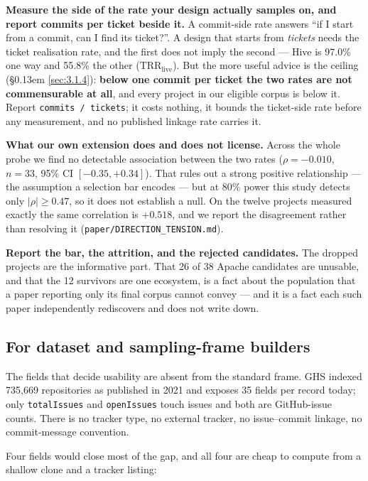 \documentclass[sigconf,review,anonymous]{acmart}
\begin{document}
\textbf{Measure the side of the rate your design actually samples on, and report commits per ticket beside it.} A commit-side rate answers ``if I start from a commit, can I find its ticket?''. A design that starts from \emph{tickets} needs the ticket realisation rate, and the first does not imply the second --- Hive is 97.0\% one way and 55.8\% the other ($\mathrm{TRR}_\mathrm{live}$). But the more useful advice is the ceiling (\S\kern0.13em \ref{sec:3.1.4}): \textbf{below one commit per ticket the two rates are not commensurable at all}, and every project in our eligible corpus is below it. Report \texttt{commits /\allowbreak{} tickets}; it costs nothing, it bounds the ticket-side rate before any measurement, and no published linkage rate carries it.

\textbf{What our own extension does and does not license.} Across the whole probe we find no detectable association between the two rates ($\rho = -0.010$, $n = 33$, 95\% CI $[-0.35, +0.34]$). That rules out a strong positive relationship --- the assumption a selection bar encodes --- but at 80\% power this study detects only $\lvert \rho \rvert \geq 0.47$, so it does not establish a null. On the twelve projects measured exactly the same correlation is $+0.518$, and we report the disagreement rather than resolving it (\texttt{paper/\allowbreak{}DIRECTION\_\allowbreak{}TENSION.\allowbreak{}md}).

\textbf{Report the bar, the attrition, and the rejected candidates.} The dropped projects are the informative part. That 26 of 38 Apache candidates are unusable, and that the 12 survivors are one ecosystem, is a fact about the population that a paper reporting only its final corpus cannot convey --- and it is a fact each such paper independently rediscovers and does not write down.

\subsection{For dataset and sampling-frame builders}
\label{sec:7.2}

The fields that decide usability are absent from the standard frame. GHS indexed 735,669 repositories as published in 2021 and exposes 35 fields per record today; only \texttt{totalIssues} and \texttt{openIssues} touch issues and both are GitHub-issue counts. There is no tracker type, no external tracker, no issue--commit linkage, no commit-message convention.

Four fields would close most of the gap, and all four are cheap to compute from a shallow clone and a tracker listing:
\end{document}
